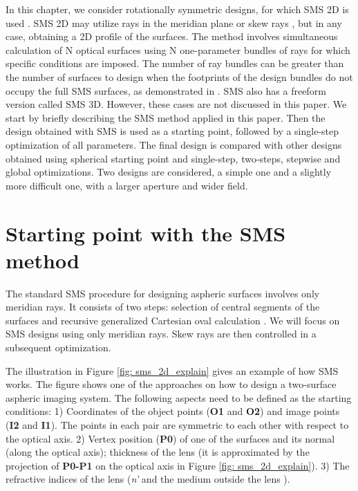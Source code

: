In this chapter, we consider rotationally symmetric designs, for which SMS 2D is used \cite{book:ChavesNonimagingOptics}. SMS 2D may utilize rays in the meridian plane or skew rays \cite{LinWang2011}, but in any case, obtaining a 2D profile of the surfaces. The method involves simultaneous calculation of N optical surfaces using N one-parameter bundles of rays for which specific conditions are imposed. The number of ray bundles can be greater than the number of surfaces to design when the footprints of the design bundles do not occupy the full SMS surfaces, as demonstrated in \cite{BenitezSPIE2014}\cite{FDuerrOE2013}\cite{FDuerrOE12}. SMS also has a freeform version called SMS 3D. However, these cases are not discussed in this paper. 
We start by briefly describing the SMS method applied in this paper. Then the design obtained with SMS is used as a starting point, followed by a single-step optimization of all parameters. The final design is compared with other designs obtained using spherical starting point and single-step, two-steps, stepwise and global optimizations. Two designs are considered, a simple one and a slightly more difficult one, with a larger aperture and wider field.
\section{Starting point with the SMS method}
The standard SMS procedure for designing aspheric surfaces involves only meridian rays. It consists of two steps: selection of central segments of the surfaces and recursive generalized Cartesian oval calculation \cite{LinWang2011}\cite{MinanoOE09}. We will focus on SMS designs using only meridian rays. Skew rays are then controlled in a subsequent optimization. 

The illustration in Figure \ref{fig: sms_2d_explain} gives an example of how SMS works. The figure shows one of the approaches on how to design a two-surface aspheric imaging system. The following aspects need to be defined as the starting conditions: 1) Coordinates of the object points (\textbf{O1} and \textbf{O2}) and image points (\textbf{I2} and \textbf{I1}). The points in each pair are symmetric to each other with respect to the optical axis. 2) Vertex position (\textbf{P0}) of one of the surfaces and its normal (along the optical axis); thickness of the lens (it is approximated by the projection of \textbf{P0-P1} on the optical axis in Figure \ref{fig: sms_2d_explain}). 3) The refractive indices of the lens (\textit{n'} and the medium outside the lens ).

